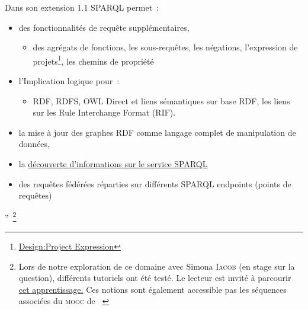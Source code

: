 Dans son extension 1.1 \gls{SPARQL} permet~:
\begin{itemize}
	\item des fonctionnalités de requête supplémentaires,
	\begin{itemize}
		\item des agrégats de fonctions, les sous-requêtes, les négations,  l'expression de projets\footnote{
		\href{https://www.w3.org/2009/sparql/wiki/Design:Project_Expression}{Design:Project Expression}}, les chemins de propriété
	\end{itemize}
	\item l'Implication logique pour~:
		\begin{itemize}
		\item RDF, RDFS, OWL Direct et liens sémantiques sur base RDF,
		 les liens sur les Rule Interchange Format (RIF).
		\end{itemize}
	\item la mise à jour des graphes RDF comme langage complet de manipulation de données,
	\item la \href{https://www.w3.org/TR/sparql11-service-description/}{découverte d'informations sur le service SPARQL}
	\item des requêtes fédérées réparties sur différents SPARQL endpoints (points de requêtes)
\end{itemize}''~\cite[traduction d'extraits du cours 3.1]{sack_openhpi_2013-1}\footnote{
Lors de notre exploration de ce domaine avec Simona \textsc{Iacob} (en stage sur la question), différents tutoriels ont été testé.
Le lecteur est invité à parcourir \href{http://enipedia.tudelft.nl/wiki/User:Simona}{cet apprentissage.}
Ces notions sont également accessible pas les séquences associées du \textsc{mooc} de \citeauthor{sack_openhpi_2013}~\cite{sack_openhpi_2013-2,sack_openhpi_2013-3,sack_openhpi_2013-4,sack_openhpi_2013}
}



